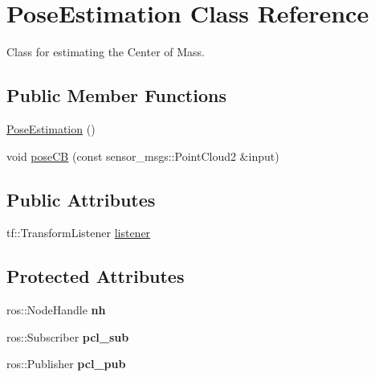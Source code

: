 \hypertarget{classPoseEstimation}{}\section{Pose\+Estimation Class Reference}
\label{classPoseEstimation}


Class for estimating the Center of Mass.  


\subsection*{Public Member Functions}
\begin{DoxyCompactItemize}
\item 
\hyperlink{classPoseEstimation_a47946518bc5a77dea91403373a1245d5}{Pose\+Estimation} ()
\item 
void \hyperlink{classPoseEstimation_abecd4cd89c868cdd877a7364c2f7e58b}{pose\+CB} (const sensor\+\_\+msgs\+::\+Point\+Cloud2 \&input)
\end{DoxyCompactItemize}
\subsection*{Public Attributes}
\begin{DoxyCompactItemize}
\item 
tf\+::\+Transform\+Listener \hyperlink{classPoseEstimation_ae08bd154a6ef0eefd852c6af56e51743}{listener}
\end{DoxyCompactItemize}
\subsection*{Protected Attributes}
\begin{DoxyCompactItemize}
\item 
ros\+::\+Node\+Handle {\bfseries nh}\hypertarget{classPoseEstimation_adc8bdfa1106405b33b892927fd3cf7a6}{}\label{classPoseEstimation_adc8bdfa1106405b33b892927fd3cf7a6}

\item 
ros\+::\+Subscriber {\bfseries pcl\+\_\+sub}\hypertarget{classPoseEstimation_a0ee1832803779449a48edc8a055dd54e}{}\label{classPoseEstimation_a0ee1832803779449a48edc8a055dd54e}

\item 
ros\+::\+Publisher {\bfseries pcl\+\_\+pub}\hypertarget{classPoseEstimation_a6890327b04ad54258ede5aa48604e5cc}{}\label{classPoseEstimation_a6890327b04ad54258ede5aa48604e5cc}

\end{DoxyCompactItemize}


